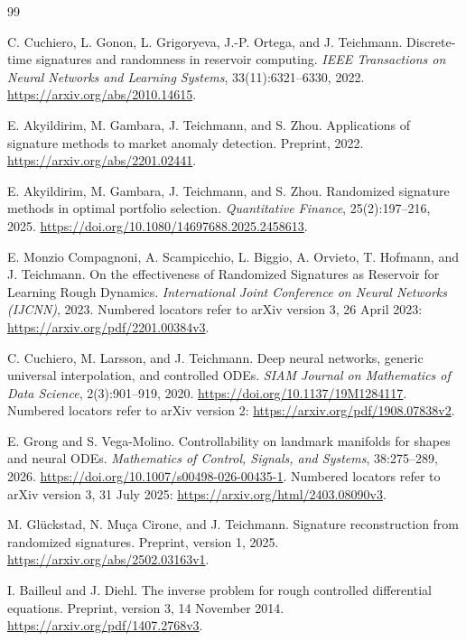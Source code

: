 \documentclass[11pt,a4paper]{article}
\numberwithin{equation}{section}
\theoremstyle{definition}
\theoremstyle{remark}
\begin{document}
\begin{thebibliography}{99}

C. Cuchiero, L. Gonon, L. Grigoryeva, J.-P. Ortega, and J. Teichmann.
Discrete-time signatures and randomness in reservoir computing.
\emph{IEEE Transactions on Neural Networks and Learning Systems},
33(11):6321--6330, 2022.
\url{https://arxiv.org/abs/2010.14615}.

E. Akyildirim, M. Gambara, J. Teichmann, and S. Zhou.
Applications of signature methods to market anomaly detection.
Preprint, 2022. \url{https://arxiv.org/abs/2201.02441}.

E. Akyildirim, M. Gambara, J. Teichmann, and S. Zhou.
Randomized signature methods in optimal portfolio selection.
\emph{Quantitative Finance}, 25(2):197--216, 2025.
\url{https://doi.org/10.1080/14697688.2025.2458613}.

E. Monzio Compagnoni, A. Scampicchio, L. Biggio, A. Orvieto,
T. Hofmann, and J. Teichmann.
On the effectiveness of Randomized Signatures as Reservoir for Learning
Rough Dynamics. \emph{International Joint Conference on Neural Networks
(IJCNN)}, 2023.
Numbered locators refer to arXiv version 3, 26 April 2023:
\url{https://arxiv.org/pdf/2201.00384v3}.

C. Cuchiero, M. Larsson, and J. Teichmann.
Deep neural networks, generic universal interpolation, and controlled ODEs.
\emph{SIAM Journal on Mathematics of Data Science}, 2(3):901--919, 2020.
\url{https://doi.org/10.1137/19M1284117}.
Numbered locators refer to arXiv version 2:
\url{https://arxiv.org/pdf/1908.07838v2}.

E. Grong and S. Vega-Molino.
Controllability on landmark manifolds for shapes and neural ODEs.
\emph{Mathematics of Control, Signals, and Systems}, 38:275--289, 2026.
\url{https://doi.org/10.1007/s00498-026-00435-1}.
Numbered locators refer to arXiv version 3, 31 July 2025:
\url{https://arxiv.org/html/2403.08090v3}.

M. Gl\"uckstad, N. Mu\c{c}a Cirone, and J. Teichmann.
Signature reconstruction from randomized signatures.
Preprint, version 1, 2025.
\url{https://arxiv.org/abs/2502.03163v1}.

I. Bailleul and J. Diehl.
The inverse problem for rough controlled differential equations.
Preprint, version 3, 14 November 2014.
\url{https://arxiv.org/pdf/1407.2768v3}.


\end{thebibliography}
\end{document}
